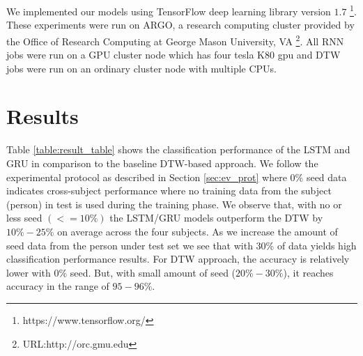 \documentclass[10pt,twocolumn,letterpaper]{article}
\begin{document}
We implemented our models using TensorFlow deep learning library 
version $1.7$ \footnote{https://www.tensorflow.org/}. These experiments were run on ARGO, a research computing 
cluster provided by the Office of Research Computing at 
George Mason University, VA \footnote{URL:http://orc.gmu.edu}.
All RNN jobs were run on a GPU cluster node which has four tesla K80 gpu and DTW jobs were run on an ordinary cluster node with multiple CPUs.


\section{Results}

Table \ref{table:result_table} shows the classification 
performance of the LSTM and GRU in comparison to the baseline DTW-based approach. We follow the experimental protocol as described in 
Section \ref{sec:ev_prot} where 0\% seed data indicates cross-subject performance where no training data from the subject (person) in test is used during the training phase. 
We observe that, with no or less seed $(<=10\%)$ the LSTM/GRU models outperform the DTW by $10\%-25\%$ on average across the four subjects. As we increase the amount of seed data from the person 
under test set we see that with 30\% of data yields high classification performance results. For DTW approach, the 
 accuracy is relatively lower with 0\% seed. But, with small amount of seed ($20\%-30\%$), it reaches accuracy in the range of $95-96\%$. 
 
 
 
\end{document}
